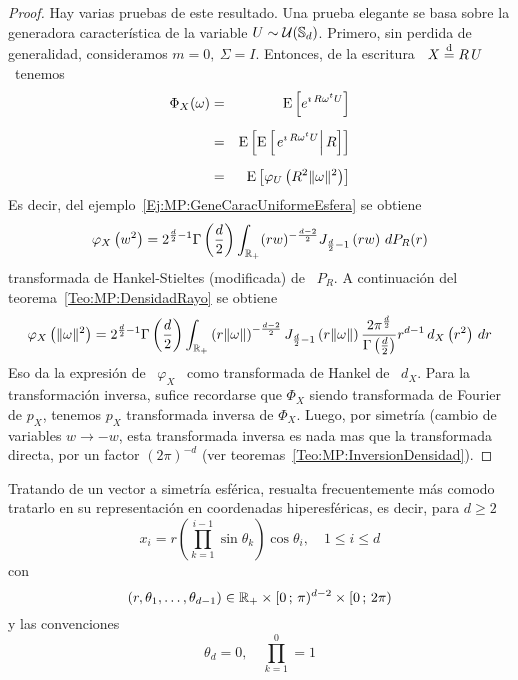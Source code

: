 \begin{proof}
  Hay varias  pruebas de este  resultado. Una prueba  elegante se basa  sobre la
  generadora caracter\'istica de la variable $U \sim \mathcal{U}(\mathbb{S}_d)$.  Primero, sin
  perdida de generalidad,  consideramos $m = 0, \: \Sigma =  I$. Entonces, de la
  escritura \ $X \stackrel{\mathrm{d}}{=} R \, U$ \ tenemos
  \begin{eqnarray*}
  \Phi_X(\omega) & = & \operatorname{E}\left[ e^{\imath \, R \omega^t U} \right]\\[2mm]
  & = & \operatorname{E}\left[ \operatorname{E}\left[ \left. e^{\imath \, R \omega^t U} \right| R \right]
  \right]\\[2mm]
  & = & \operatorname{E}\left[ \varphi_U\left( R^2 \| \omega \|^2 \right)  \right]
  \end{eqnarray*}
  Es    decir,    del    ejemplo~\ref{Ej:MP:GeneCaracUniformeEsfera} se obtiene
  \[
  \varphi_X\left(  w^2  \right)  =  2^{\frac{d}{2}-1}  \Gamma\left(
    \frac{d}{2}  \right)  \int_{\mathbb{R}_+}  (r w)^{-
    \frac{d-2}{2}}  J_{\frac{d}{2}-1}  \left( r  w \right)  \, dP_R(r)
  \]
  transformada de Hankel-Stieltes (modificada)  de \ $P_R$. A continuaci\'on del
  teorema~\ref{Teo:MP:DensidadRayo} se obtiene
  \[
  \varphi_X\left(  \|  \omega  \|^2  \right)  =  2^{\frac{d}{2}-1}  \Gamma\left(
    \frac{d}{2}  \right)  \int_{\mathbb{R}_+}  \left(   r  \|  \omega  \|  \right)^{-
    \frac{d-2}{2}}  J_{\frac{d}{2}-1}  \left( r  \|  \omega  \| \right)  \frac{2
    \pi^{\frac{d}{2}}}{\Gamma\left(  \frac{d}{2} \right)}  r^{d-1}  \, d_X\left(
    r^2 \right) \, dr
  \]
  Eso da  la expresi\'on  de \ $\varphi_X$  \ como  transformada de Hankel  de \
  $d_X$. Para la transformaci\'on inversa, sufice recordarse que $\Phi_X$ siendo
  transformada  de  Fourier  de  $p_X$,  tenemos $p_X$  transformada  inversa  de
  $\Phi_X$.  Luego,  por  simetr\'ia  (cambio  de variables  $w  \to  -w$,  esta
  transformada inversa  es nada mas que  la transformada directa,  por un factor
  $(2 \pi)^{-d}$ (ver teoremas~\ref{Teo:MP:InversionDensidad}).
\end{proof}

Tratando  de un vector  a simetr\'ia  esf\'erica, resualta  frecuentemente m\'as
comodo  tratarlo  en su  representaci\'on  en  coordenadas hiperesf\'ericas,  es
decir, para $d \ge 2$
%
\[
x_i = r \left( \prod_{k=1}^{i-1} \sin\theta_k \right) \cos \theta_i, \quad 1 \le
i \le d
\]
%
con
%
\[
(r,\theta_1,\ldots,\theta_{d-1}) \in  \mathbb{R}_+ \times [0 \, ; \,  \pi)^{d-2} \times [0
\, ; \, 2 \pi)
\]
%
y las convenciones
%
\[
\theta_d = 0, \quad \prod_{k=1}^{0} = 1
\]

